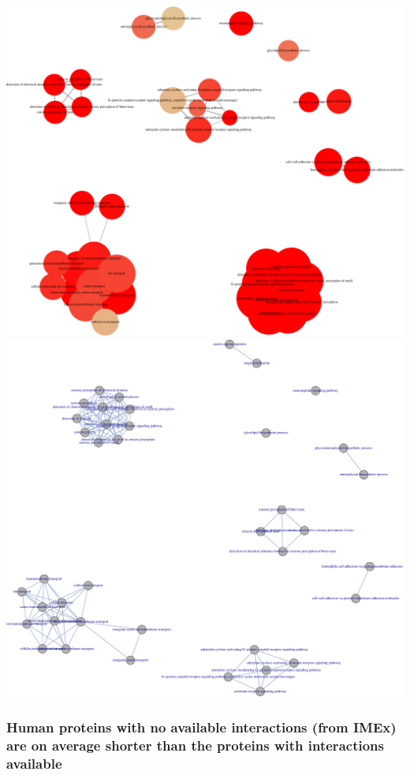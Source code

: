 \documentclass[]{article}
\begin{document}
\includegraphics{final_report_files/figure-latex/GO_enrichment_map-1.pdf}
\includegraphics{final_report_files/figure-latex/GO_enrichment_map-2.pdf}

\subsubsection{Human proteins with no available interactions (from IMEx)
are on average shorter than the proteins with interactions
available}\label{human-proteins-with-no-available-interactions-from-imex-are-on-average-shorter-than-the-proteins-with-interactions-available}
\end{document}
